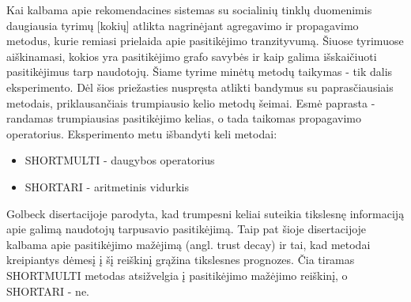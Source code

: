 \documentclass{VUMIFInfMagistrinis}
\begin{document}
\indent
Kai kalbama apie rekomendacines sistemas su socialinių tinklų duomenimis daugiausia tyrimų [kokių] atlikta nagrinėjant agregavimo ir propagavimo metodus, kurie remiasi prielaida apie pasitikėjimo tranzityvumą. Šiuose tyrimuose aiškinamasi, kokios yra pasitikėjimo grafo savybės ir kaip galima išskaičiuoti pasitikėjimus tarp naudotojų. Šiame tyrime minėtų metodų taikymas - tik dalis eksperimento. Dėl šios priežasties nuspręsta atlikti bandymus su paprasčiausiais metodais, priklausančiais trumpiausio kelio metodų šeimai. Esmė paprasta - randamas trumpiausias pasitikėjimo kelias, o tada taikomas propagavimo operatorius. Eksperimento metu išbandyti keli metodai:
\begin{itemize}
	\item SHORTMULTI - daugybos operatorius
	\item SHORTARI - aritmetinis vidurkis
\end{itemize}
\indent 
Golbeck disertacijoje parodyta, kad trumpesni keliai suteikia tikslesnę informaciją apie galimą naudotojų tarpusavio pasitikėjimą. Taip pat šioje disertacijoje kalbama apie pasitikėjimo mažėjimą (angl. trust decay) ir tai, kad metodai kreipiantys dėmesį į šį reiškinį grąžina tikslesnes prognozes. Čia tiramas SHORTMULTI metodas atsižvelgia į pasitikėjimo mažėjimo reiškinį, o SHORTARI - ne.
\end{document}
